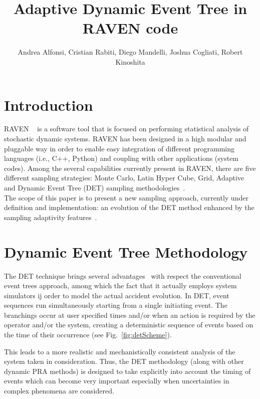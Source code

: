 \documentclass{anstrans}
\title{Adaptive Dynamic Event Tree in RAVEN code}
\author{Andrea Alfonsi, Cristian Rabiti, Diego Mandelli, Joshua Cogliati, Robert Kinoshita}
\institute{Idaho National Laboratory, 2525 Fremont Avenue, Idaho Falls, ID 83402, United States}
\begin{document}
\section{Introduction}

RAVEN ~\cite{ravenFY12,alfonsiMC} is a software tool that is focused on performing statistical analysis of stochastic dynamic systems. RAVEN has been designed in a high modular and pluggable way in order to enable easy integration of different programming languages (i.e., C++, Python) and coupling with other applications (system codes). Among the several capabilities currently present in RAVEN, there are five different sampling strategies: Monte Carlo, Latin Hyper Cube, Grid, Adaptive and Dynamic Event Tree (DET) sampling methodologies~\cite{ravenFY14}. \\ The scope of this paper is to present a new sampling approach, currently under definition and implementation: an evolution of the DET method enhanced by the  sampling adaptivity features~\cite{mandelliSVMANS}. 


\section{Dynamic Event Tree Methodology}
The DET technique brings several advantages~\cite{alfonsiPSA2013,ADAPTHakobyan} with respect the conventional event trees approach, among which the fact that it actually employs system simulators ij order to model the actual accident evolution. In DET,  event sequences run simultaneously starting from a single initiating event. The branchings occur at user specified times and/or when an action is required by the operator and/or the system, creating a deterministic sequence of events based on the time of their occurrence (see Fig.~\ref{fig:detScheme}). 

This leads to a more realistic and mechanistically consistent analysis of the system taken in consideration. Thus, the DET methodology (along with other dynamic PRA methods) is designed to take explicitly into account the timing of events which can become very important especially when uncertainties in complex phenomena are considered. 
\end{document}
